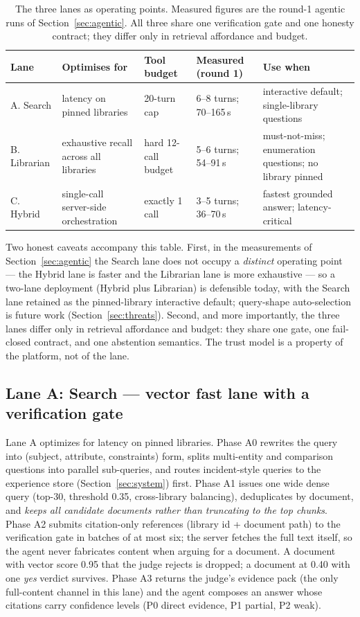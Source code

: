 \documentclass[preprint,12pt]{elsarticle}
\begin{document}
\begin{table}[!htbp]
\centering
\scriptsize
\setlength{\tabcolsep}{3.5pt}
\caption{The three lanes as operating points. Measured figures are the
round-1 agentic runs of Section~\ref{sec:agentic}. All three share one
verification gate and one honesty contract; they differ only in retrieval
affordance and budget.}
\label{tab:lanes}
\begin{tabular}{p{1.85cm}p{3.05cm}p{2.15cm}p{2.25cm}p{3.15cm}}
\toprule
Lane & Optimises for & Tool budget & Measured (round 1) & Use when \\
\midrule
A. Search & latency on pinned libraries & 20-turn cap & 6--8 turns; 70--165\,s & interactive default; single-library questions \\
B. Librarian & exhaustive recall across all libraries & hard 12-call budget & 5--6 turns; 54--91\,s & must-not-miss; enumeration questions; no library pinned \\
C. Hybrid & single-call server-side orchestration & exactly 1 call & 3--5 turns; 36--70\,s & fastest grounded answer; latency-critical \\
\bottomrule
\end{tabular}
\end{table}

Two honest caveats accompany this table. First, in the measurements of
Section~\ref{sec:agentic} the Search lane does not occupy a \emph{distinct}
operating point --- the Hybrid lane is faster and the Librarian lane is more
exhaustive --- so a two-lane deployment (Hybrid plus Librarian) is defensible
today, with the Search lane retained as the pinned-library interactive
default; query-shape auto-selection is future work
(Section~\ref{sec:threats}). Second, and more importantly, the three lanes
differ only in retrieval affordance and budget: they share one gate, one
fail-closed contract, and one abstention semantics. The trust model is a
property of the platform, not of the lane.

\subsection{Lane A: Search --- vector fast lane with a verification gate}
Lane A optimizes for latency on pinned libraries. Phase A0 rewrites the
query into (subject, attribute, constraints) form, splits multi-entity and
comparison questions into parallel sub-queries, and routes incident-style
queries to the experience store (Section~\ref{sec:system}) first. Phase A1
issues one wide dense query
(top-30, threshold 0.35, cross-library balancing), deduplicates by document,
and \emph{keeps all candidate documents rather than truncating to the top
chunks}. Phase A2 submits citation-only references (library id + document
path) to the verification gate in batches of at most six; the server fetches the
full text itself, so the agent never fabricates content when arguing for a
document. A document with vector score 0.95 that the judge rejects is
dropped; a document at 0.40 with one \emph{yes} verdict survives. Phase A3
returns the judge's evidence pack (the only full-content channel in this
lane) and the agent composes an answer whose citations carry confidence
levels (P0 direct evidence, P1 partial, P2 weak).
\end{document}

